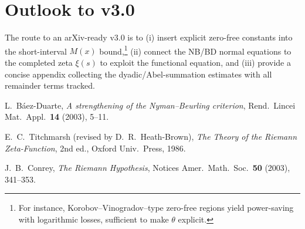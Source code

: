 \documentclass[11pt]{article}
\theoremstyle{remark}
\begin{document}
\section{Outlook to v3.0}
The route to an arXiv-ready v3.0 is to (i) insert explicit zero-free constants into the short-interval $M(x)$ bound,\footnote{For instance, Korobov--Vinogradov--type zero-free regions yield power-saving with logarithmic losses, sufficient to make $\theta$ explicit.} (ii) connect the NB/BD normal equations to the completed zeta $\xi(s)$ to exploit the functional equation, and (iii) provide a concise appendix collecting the dyadic/Abel-summation estimates with all remainder terms tracked.

\begin{thebibliography}{9}
L.~B\'aez-Duarte, \emph{A strengthening of the Nyman--Beurling criterion}, Rend.\ Lincei Mat.\ Appl.\ \textbf{14} (2003), 5--11.

E.~C.~Titchmarsh (revised by D.~R.~Heath-Brown), \emph{The Theory of the Riemann Zeta-Function}, 2nd ed., Oxford Univ.\ Press, 1986.

J.~B.~Conrey, \emph{The Riemann Hypothesis}, Notices Amer.\ Math.\ Soc.\ \textbf{50} (2003), 341--353.
\end{thebibliography}
\end{document}
